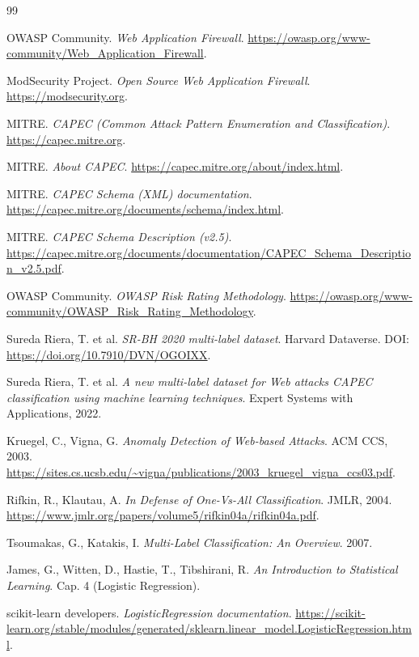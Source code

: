 \documentclass[12pt,oneside]{report}
\begin{document}
\begin{thebibliography}{99}

OWASP Community. \emph{Web Application Firewall}. \url{https://owasp.org/www-community/Web_Application_Firewall}.

ModSecurity Project. \emph{Open Source Web Application Firewall}. \url{https://modsecurity.org}.

MITRE. \emph{CAPEC (Common Attack Pattern Enumeration and Classification)}. \url{https://capec.mitre.org}.

MITRE. \emph{About CAPEC}. \url{https://capec.mitre.org/about/index.html}.

MITRE. \emph{CAPEC Schema (XML) documentation}. \url{https://capec.mitre.org/documents/schema/index.html}.

MITRE. \emph{CAPEC Schema Description (v2.5)}. \url{https://capec.mitre.org/documents/documentation/CAPEC_Schema_Description_v2.5.pdf}.

OWASP Community. \emph{OWASP Risk Rating Methodology}. \url{https://owasp.org/www-community/OWASP_Risk_Rating_Methodology}.

Sureda Riera, T. et al. \emph{SR-BH 2020 multi-label dataset}. Harvard Dataverse.
DOI: \url{https://doi.org/10.7910/DVN/OGOIXX}.

Sureda Riera, T. et al. \emph{A new multi-label dataset for Web attacks CAPEC classification using machine learning techniques}.
Expert Systems with Applications, 2022.

Kruegel, C., Vigna, G. \emph{Anomaly Detection of Web-based Attacks}. ACM CCS, 2003.
\url{https://sites.cs.ucsb.edu/~vigna/publications/2003_kruegel_vigna_ccs03.pdf}.

Rifkin, R., Klautau, A. \emph{In Defense of One-Vs-All Classification}. JMLR, 2004.
\url{https://www.jmlr.org/papers/volume5/rifkin04a/rifkin04a.pdf}.

Tsoumakas, G., Katakis, I. \emph{Multi-Label Classification: An Overview}. 2007.

James, G., Witten, D., Hastie, T., Tibshirani, R. \emph{An Introduction to Statistical Learning}. Cap. 4 (Logistic Regression).

scikit-learn developers. \emph{LogisticRegression documentation}. \url{https://scikit-learn.org/stable/modules/generated/sklearn.linear_model.LogisticRegression.html}.


\end{thebibliography}
\end{document}
